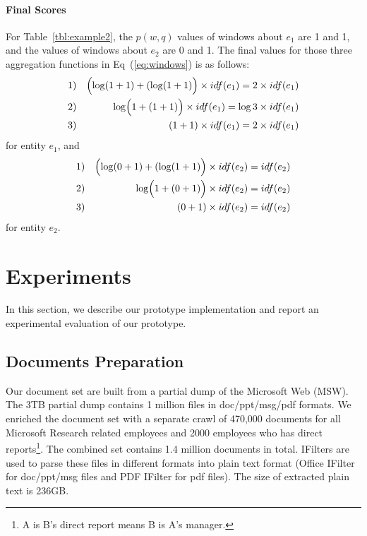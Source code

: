 \documentclass{sig-alternate}
\theoremstyle{definition}
\begin{document}
\paragraph*{Final Scores} For Table~\ref{tbl:example2}, the $p(w, q)$ values of windows about $e_1$ are 1 and 1, and the values of windows about $e_2$ are 0 and 1. The final values for those three aggregation functions in Eq~(\ref{eq:windows}) is as follows:
\begin{eqnarray}
1) && \Bigl(\log(1 + 1) + (\log(1 + 1)\Bigr) \times idf(e_1) = 2 \times idf(e_1) \nonumber \\
2) && \log\Bigl(1 + (1 + 1)\Bigr) \times idf(e_1) = \log 3 \times idf(e_1) \nonumber \\
3) && (1 + 1) \times idf(e_1) = 2 \times idf(e_1) \nonumber
\end{eqnarray}
for entity $e_1$, and
\begin{eqnarray}
1) && \Bigl(\log(0 + 1) + (\log(1 + 1)\Bigr) \times idf(e_2) = idf(e_2) \nonumber \\
2) && \log\Bigl(1 + (0 + 1)\Bigr) \times idf(e_2) = idf(e_2) \nonumber \\
3) && (0 + 1) \times idf(e_2) = idf(e_2) \nonumber
\end{eqnarray}
for entity $e_2$.

\section{Experiments}\label{sec:experiment}
In this section, we describe our prototype implementation and report an experimental evaluation of our prototype.

\subsection{Documents Preparation}
Our document set are built from a partial dump of the Microsoft Web (MSW). The 3TB partial dump contains 1 million files in doc/ppt/msg/pdf formats. We enriched the document set with a separate crawl of 470,000 documents for all Microsoft Research related employees and 2000 employees who has direct reports\footnote{A is B's direct report means B is A's manager.}. The combined set contains 1.4 million documents in total. IFilters are used to parse these files in different formats into plain text format (Office IFilter for doc/ppt/msg files and PDF IFilter for pdf files). The size of extracted plain text is 236GB.
\end{document}
